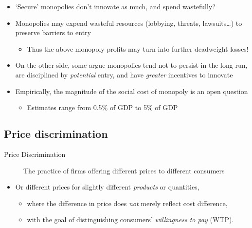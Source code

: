 \documentclass[]{article}
\providecommand{\tightlist}{%
  \setlength{\itemsep}{0pt}\setlength{\parskip}{0pt}}
\begin{document}
\begin{itemize}
\item
  `Secure' monopolies don't innovate as much, and spend wastefully?
\item
  Monopolies may expend wasteful resources (lobbying, threats, lawsuits\ldots{}) to preserve barriers to entry

  \begin{itemize}
  \tightlist
  \item
    Thus the above monopoly profits may turn into further deadweight losses!
  \end{itemize}
\item
  On the other side, some argue monopolies tend not to persist in the long run, are disciplined by \emph{potential} entry, and have \emph{greater} incentives to innovate
\item
  Empirically, the magnitude of the social cost of monopoly is an open question

  \begin{itemize}
  \tightlist
  \item
    Estimates range from 0.5\% of GDP to 5\% of GDP
  \end{itemize}
\end{itemize}

\hypertarget{price-discrimination}{%
\subsection{Price discrimination}\label{price-discrimination}}

\begin{description}
\item[Price Discrimination]
The practice of firms offering different prices to different consumers
\end{description}

\begin{itemize}
\tightlist
\item
  Or different prices for slightly different \emph{products} or quantities,

  \begin{itemize}
  \tightlist
  \item
    where the difference in price does \emph{not} merely reflect cost difference,
  \item
    with the goal of distinguishing consumers' \emph{willingness to pay} (WTP).
  \end{itemize}
\end{itemize}
\end{document}
